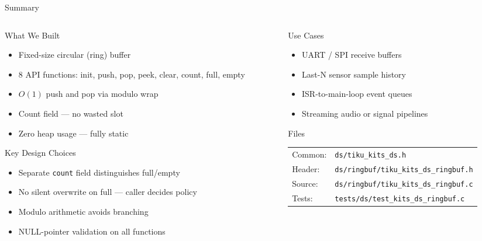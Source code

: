 \documentclass[aspectratio=169, 10pt]{beamer}
\begin{document}
\begin{frame}{Summary}
\begin{columns}[T]
\begin{column}{0.48\textwidth}
\begin{block}{What We Built}
\begin{itemize}
  \item Fixed-size circular (ring) buffer
  \item 8 API functions: init, push, pop, peek, clear, count, full, empty
  \item $O(1)$ push and pop via modulo wrap
  \item Count field --- no wasted slot
  \item Zero heap usage --- fully static
\end{itemize}
\end{block}

\begin{block}{Key Design Choices}
\begin{itemize}
  \item Separate \texttt{count} field distinguishes full/empty
  \item No silent overwrite on full --- caller decides policy
  \item Modulo arithmetic avoids branching
  \item NULL-pointer validation on all functions
\end{itemize}
\end{block}
\end{column}

\begin{column}{0.48\textwidth}
\begin{block}{Use Cases}
\begin{itemize}
  \item UART / SPI receive buffers
  \item Last-N sensor sample history
  \item ISR-to-main-loop event queues
  \item Streaming audio or signal pipelines
\end{itemize}
\end{block}

\begin{block}{Files}
\scriptsize
\begin{tabular}{@{}lp{4.5cm}@{}}
Common: & \texttt{ds/tiku\_kits\_ds.h} \\
Header: & \texttt{ds/ringbuf/tiku\_kits\_ds\_ringbuf.h} \\
Source: & \texttt{ds/ringbuf/tiku\_kits\_ds\_ringbuf.c} \\
Tests:  & \texttt{tests/ds/test\_kits\_ds\_ringbuf.c} \\
\end{tabular}
\end{block}
\end{column}
\end{columns}
\end{frame}
\end{document}
